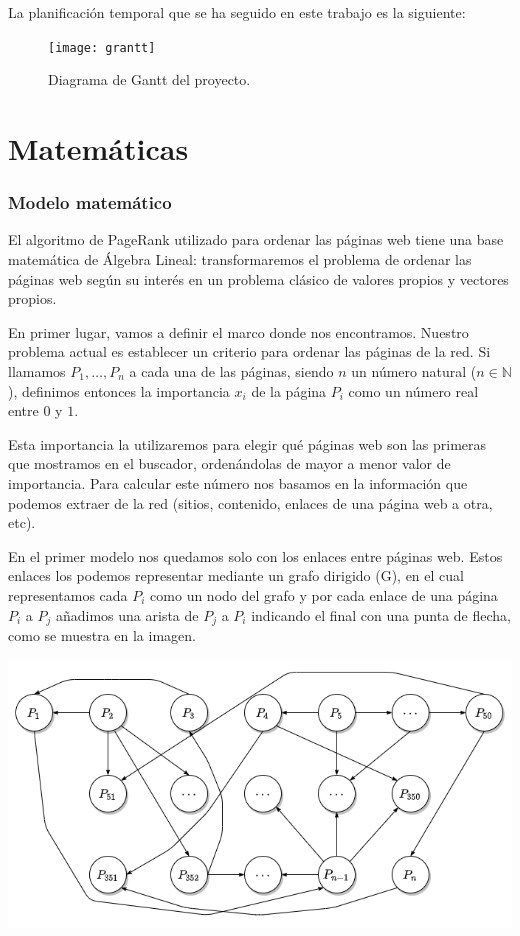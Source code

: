 \documentclass[size=a4, parskip=half, titlepage=false, toc=flat, toc=bib, 12pt]{scrartcl}
\theoremstyle{theorem-style}
\theoremstyle{definition-style}
\theoremstyle{remark-style}
\theoremstyle{example-style}
\theoremstyle{definition-style}
\theoremstyle{remark-style}
\begin{document}
La planificación temporal que se ha seguido en este trabajo es la siguiente:
\begin{figure}[H]
\centering
\texttt{[image: grantt]}
\caption{Diagrama de Gantt del proyecto.}
\end{figure}
\newpage

\part{Matemáticas}

\section{Modelo matemático}

El algoritmo de PageRank utilizado para ordenar las páginas web tiene una base matemática de Álgebra Lineal: transformaremos el problema de ordenar las páginas web según su interés en un problema clásico de valores propios y vectores propios.

En primer lugar, vamos a definir el marco donde nos encontramos. Nuestro problema actual es establecer un criterio para ordenar las páginas de la red. Si llamamos $P_1, \dots, P_n$ a cada una de las páginas, siendo $n$ un número natural ($n \in \mathbb{N}$), definimos entonces la importancia $x_i$  de la página $P_i$ como un número real entre $0$ y $1$.

Esta importancia la utilizaremos para elegir qué páginas web son las primeras que mostramos en el buscador, ordenándolas de mayor  a menor valor de importancia.
Para calcular este número nos basamos en la información que podemos extraer de la red (sitios, contenido, enlaces de una página web a otra, etc).

En el primer modelo nos quedamos solo con los enlaces entre páginas web. Estos enlaces los podemos representar mediante un grafo dirigido (G), en el cual representamos cada $P_i$ como un nodo del grafo y por cada enlace de una página $P_i$ a $P_j$ añadimos una arista de $P_j$ a $P_i$ indicando el final con una punta de flecha, como se muestra en la imagen.

\includegraphics[width=1.0\textwidth]{./img/grafogrande}
\end{document}
